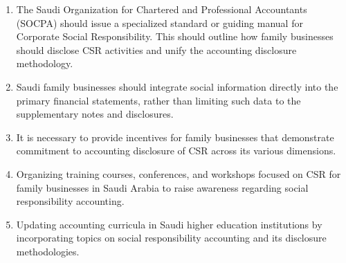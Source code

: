 \documentclass[10pt]{NSP1}
\begin{document}
\begin{enumerate}
    \item The Saudi Organization for Chartered and Professional Accountants (SOCPA) should issue a specialized standard or guiding manual for Corporate Social Responsibility. This should outline how family businesses should disclose CSR activities and unify the accounting disclosure methodology.
    \item Saudi family businesses should integrate social information directly into the primary financial statements, rather than limiting such data to the supplementary notes and disclosures.
    \item It is necessary to provide incentives for family businesses that demonstrate commitment to accounting disclosure of CSR across its various dimensions.
    \item Organizing training courses, conferences, and workshops focused on CSR for family businesses in Saudi Arabia to raise awareness regarding social responsibility accounting.
    \item Updating accounting curricula in Saudi higher education institutions by incorporating topics on social responsibility accounting and its disclosure methodologies.
\end{enumerate}
\end{document}
